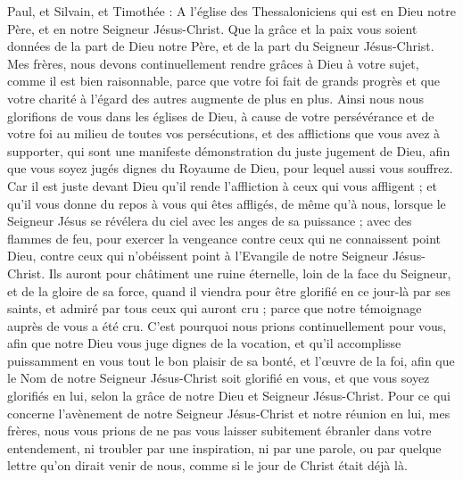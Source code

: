 \begin{multicols}{2}
\TextTitle{[Introduction]}
\VerseOne{}Paul, et Silvain, et Timothée : A l'église des Thessaloniciens qui est en Dieu notre Père, et en notre Seigneur Jésus-Christ.
Que la grâce et la paix vous soient données de la part de Dieu notre Père, et de la part du Seigneur Jésus-Christ.
Mes frères, nous devons continuellement rendre grâces à Dieu à votre sujet, comme il est bien raisonnable, parce que votre foi fait de grands progrès et que votre charité à l’égard des autres augmente de plus en plus.
Ainsi nous nous glorifions de vous dans les églises de Dieu, à cause de votre persévérance et de votre foi au milieu de toutes vos persécutions, et des afflictions que vous avez à supporter,
qui sont une manifeste démonstration du juste jugement de Dieu, afin que vous soyez jugés dignes du Royaume de Dieu, pour lequel aussi vous souffrez.
Car il est juste devant Dieu qu'il rende l'affliction à ceux qui vous affligent ;
et qu'il vous donne du repos à vous qui êtes affligés, de même qu'à nous, lorsque le Seigneur Jésus se révélera du ciel avec les anges de sa puissance ;
avec des flammes de feu, pour exercer la vengeance contre ceux qui ne connaissent point Dieu, contre ceux qui n'obéissent point à l'Evangile de notre Seigneur Jésus-Christ.
Ils auront pour châtiment une ruine éternelle, loin de la face du Seigneur, et de la gloire de sa force,
quand il viendra pour être glorifié en ce jour-là par ses saints, et admiré par tous ceux qui auront cru ; parce que notre témoignage auprès de vous a été cru.
C'est pourquoi nous prions continuellement pour vous, afin que notre Dieu vous juge dignes de la vocation, et qu'il accomplisse puissamment en vous tout le bon plaisir de sa bonté, et l’œuvre de la foi,
afin que le Nom de notre Seigneur Jésus-Christ soit glorifié en vous, et que vous soyez glorifiés en lui, selon la grâce de notre Dieu et Seigneur Jésus-Christ.
\VerseOne{}Pour ce qui concerne l'avènement de notre Seigneur Jésus-Christ et notre réunion en lui, mes frères, nous vous prions
de ne pas vous laisser subitement ébranler dans votre entendement, ni troubler par une inspiration, ni par une parole, ou par quelque lettre qu’on dirait venir de nous, comme si le jour de Christ était déjà là.

\end{multicols}
